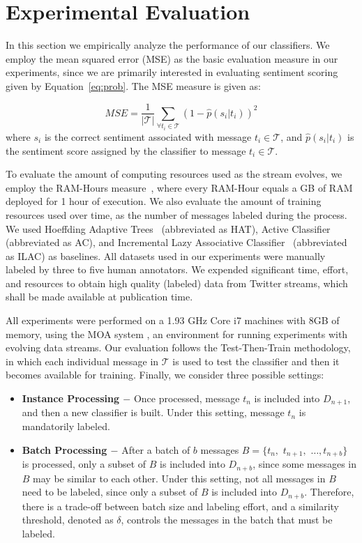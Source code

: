 \documentclass{sig-alternate}
\begin{document}
\section{Experimental Evaluation}

In this section we empirically analyze the performance of our classifiers. We employ the mean squared error (MSE) as the basic evaluation measure in our experiments, since we are primarily interested in evaluating sentiment scoring given by Equation~\ref{eq:prob}. The MSE measure is given as: 

\begin{equation}
\label{rmse}
\mathit{MSE} = \displaystyle\frac{1}{|\mathcal{T}|} \displaystyle\sum_{\forall t_i\in\mathcal{T}} (1 - \hat{p}(s_i|t_i))^2
\end{equation}
\noindent where $s_i$ is the correct sentiment associated with message $t_i\in\mathcal{T}$, and $\hat{p}(s_i|t_i)$ is the sentiment score assigned by the classifier to message $t_i\in\mathcal{T}$.

To evaluate the amount of computing resources used as the stream evolves, we employ the RAM-Hours measure~\cite{Bifet:2010:FPD:2144032.2144069}, where every RAM-Hour equals a GB of RAM deployed for 1 hour of execution. We also evaluate the amount of training resources used over time, as the number of messages labeled during the process. We used Hoeffding Adaptive Trees~\cite{bifetsent1,bifetsent2} (abbreviated as HAT), Active Classifier~\cite{6414645,Indre2011k} (abbreviated as AC), and Incremental Lazy Associative Classifier~\cite{sigir} (abbreviated as ILAC) as baselines. All datasets used in our experiments were manually labeled by three to five human annotators.
We expended significant time, effort,
and resources to obtain high quality (labeled) data from Twitter streams,
which shall be made available at publication time.

All experiments were performed on a 1.93 GHz Core i7 machines with 8GB of memory, using the MOA system \cite{moa}, an environment for running experiments with evolving data streams.
Our evaluation follows the Test-Then-Train methodology, in which 
each individual message in $\mathcal{T}$ is used to test the classifier
and then it becomes available for training.
Finally, we consider three possible settings:
\begin{itemize}
\item{\bf{Instance Processing $-$}}
Once processed, message $t_n$ is included into $D_{n+1}$, and then a new classifier is built. Under this setting, message $t_n$ is mandatorily labeled.
\item{\bf{Batch Processing $-$}}
After a batch of $b$ messages $B=\{t_n,$ $t_{n+1},$ $\ldots, t_{n+b}\}$ is processed, only a subset of $B$ is included into $D_{n+b}$, since some messages in $B$ may be similar to each other. Under this setting, not all messages in $B$ need to be labeled, since only a subset of $B$ is included into $D_{n+b}$. Therefore, there is a trade-off between batch size and labeling effort, and a similarity threshold, denoted as $\delta$, controls the messages in the batch that must be labeled.
\end{itemize}
\end{document}
